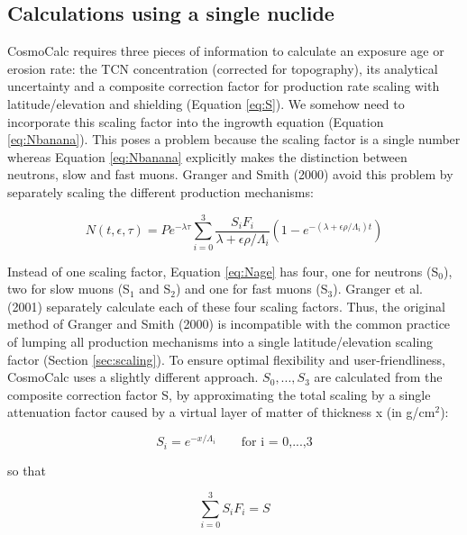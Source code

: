 \documentclass{article}
\begin{document}
\subsection{Calculations using a single nuclide}\label{sec:oneN}

CosmoCalc  requires  three  pieces  of  information  to  calculate  an
exposure  age or erosion  rate: the  TCN concentration  (corrected for
topography),  its analytical  uncertainty and  a  composite correction
factor  for  production   rate  scaling  with  latitude/elevation  and
shielding (Equation \ref{eq:S}).  We  somehow need to incorporate this
scaling factor into the ingrowth equation (Equation \ref{eq:Nbanana}).
This poses  a problem  because the scaling  factor is a  single number
whereas  Equation \ref{eq:Nbanana}  explicitly  makes the  distinction
between neutrons, slow and fast muons.  Granger and Smith (2000) avoid
this   problem  by   separately  scaling   the   different  production
mechanisms:

\begin{equation}
  \label{eq:Nage}
N(t,\epsilon,\tau) = P e^{- \lambda \tau}
\sum_{i=0}^3
\frac{S_i F_i}{\lambda + \epsilon \rho / \Lambda_i} 
\left( 1 - e^{- \left( \lambda + \epsilon \rho / \Lambda_i \right) t} \right)
\end{equation}

Instead of  one scaling factor,  Equation \ref{eq:Nage} has  four, one
for neutrons (S$_0$), two for slow muons (S$_1$ and S$_2$) and one for
fast muons (S$_3$). Granger et al. (2001) separately calculate each of
these four scaling factors.  Thus,  the original method of Granger and
Smith (2000) is  incompatible with the common practice  of lumping all
production mechanisms into  a single latitude/elevation scaling factor
(Section  \ref{sec:scaling}).   To   ensure  optimal  flexibility  and
user-friendliness,  CosmoCalc  uses  a  slightly different  approach.  
$S_0,...,S_3$ are  calculated from the composite  correction factor S,
by  approximating the  total scaling  by a  single  attenuation factor
caused by a virtual layer of matter of thickness x (in g/cm$^2$):

\begin{equation}
  \label{eq:Sx}
  S_i = e^{-x/\Lambda_i} \mbox{~~~~~~for i = 0,...,3} 
\end{equation}

so that

\begin{equation}
  \label{eq:solveSx}
  \sum_{i=0}^3 S_i F_i = S
\end{equation}
\end{document}
